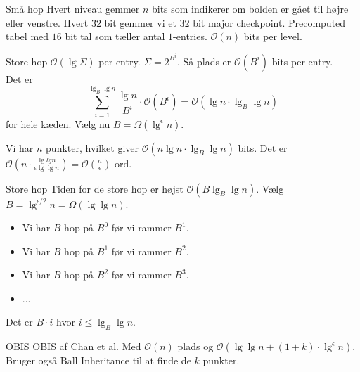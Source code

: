 \documentclass[pdf]{beamer}
\begin{document}
\begin{frame}{Små hop}
  Hvert niveau gemmer $n$ bits som indikerer om bolden er gået til højre eller venstre. Hvert $32$ bit gemmer vi et $32$ bit major checkpoint. Precomputed tabel med $16$ bit tal som tæller antal $1$-entries. $\mathcal{O}(n)$ bits per level.
\end{frame}

\begin{frame}{Store hop}
  $\mathcal{O}(\lg \Sigma)$ per entry. $\Sigma = 2^{B^i}$. Så plads er $\mathcal{O}(B^i)$ bits per entry.\\

  Det er $$\sum_{i=1}^{\lg_B \lg n} \frac{\lg n}{B^i}\cdot\mathcal{O}(B^i) = \mathcal{O}(\lg n \cdot \lg_B \lg n)$$ for hele kæden. Vælg nu $B = \Omega(\lg^\epsilon n)$.


  Vi har $n$ punkter, hvilket giver $\mathcal{O}(n\lg n \cdot\lg_B \lg n)$ bits. Det er $\mathcal{O}(n\cdot\frac{\lg lg n}{\epsilon \lg \lg n}) = \mathcal{O}(\frac{n}{\epsilon})$ ord.
\end{frame}

\begin{frame}{Store hop}
  Tiden for de store hop er højst $\mathcal{O}(B \lg_B \lg n)$. Vælg $B = \lg^{\epsilon / 2} n = \Omega(\lg \lg n)$.
\end{frame}

\begin{frame}
  \begin{itemize}
    \item Vi har $B$ hop på $B^0$ før vi rammer $B^1$.
    \item Vi har $B$ hop på $B^1$ før vi rammer $B^2$.
    \item Vi har $B$ hop på $B^2$ før vi rammer $B^3$.
    \item ...
  \end{itemize}
  Det er $B \cdot i$ hvor $i \leq \lg_B \lg n$.
\end{frame}


\begin{frame}{OBIS}
  OBIS af Chan et al. Med $\mathcal{O}(n)$ plads og $\mathcal{O}(\lg \lg n + (1+k)\cdot\lg^\epsilon n)$. Bruger også Ball Inheritance til at finde de $k$ punkter.
\end{frame}
\end{document}
